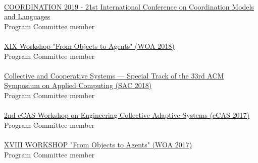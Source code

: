 \halfblankline \\
\href{http://www.discotec.org/2019/coordination}{COORDINATION 2019 - 21st International Conference on Coordination Models and Languages}
\\ Program Committee member \\
\halfblankline \\
\href{http://diid.unipa.it/roboticslab/woa2018/}{XIX Workshop "From Objects to Agents" (WOA 2018)}
\\ Program Committee member \\
\halfblankline \\
\href{http://sac-cas2018.apice.unibo.it/referees.html}{Collective and Cooperative Systems --- Special Track of the 33rd ACM Symposium on Applied Computing (SAC 2018)}
\\ Program Committee member \\
\halfblankline \\
\href{http://apice.unibo.it/xwiki/bin/view/ECAS2017/WebHome}{2nd eCAS Workshop on Engineering Collective Adaptive Systems (eCAS 2017)}
\\ Program Committee member \\
\halfblankline \\
\href{http://woa2017.unirc.it/}{XVIII WORKSHOP "From Objects to Agents" (WOA 2017)}
\\ Program Committee member \\
